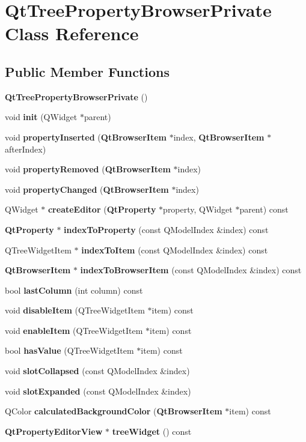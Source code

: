 \section{Qt\+Tree\+Property\+Browser\+Private Class Reference}
\label{classQtTreePropertyBrowserPrivate}
\subsection*{Public Member Functions}
\begin{DoxyCompactItemize}
\item 
{\bf Qt\+Tree\+Property\+Browser\+Private} ()
\item 
void {\bf init} (Q\+Widget $\ast$parent)
\item 
void {\bf property\+Inserted} ({\bf Qt\+Browser\+Item} $\ast$index, {\bf Qt\+Browser\+Item} $\ast$after\+Index)
\item 
void {\bf property\+Removed} ({\bf Qt\+Browser\+Item} $\ast$index)
\item 
void {\bf property\+Changed} ({\bf Qt\+Browser\+Item} $\ast$index)
\item 
Q\+Widget $\ast$ {\bf create\+Editor} ({\bf Qt\+Property} $\ast$property, Q\+Widget $\ast$parent) const 
\item 
{\bf Qt\+Property} $\ast$ {\bf index\+To\+Property} (const Q\+Model\+Index \&index) const 
\item 
Q\+Tree\+Widget\+Item $\ast$ {\bf index\+To\+Item} (const Q\+Model\+Index \&index) const 
\item 
{\bf Qt\+Browser\+Item} $\ast$ {\bf index\+To\+Browser\+Item} (const Q\+Model\+Index \&index) const 
\item 
bool {\bf last\+Column} (int column) const 
\item 
void {\bf disable\+Item} (Q\+Tree\+Widget\+Item $\ast$item) const 
\item 
void {\bf enable\+Item} (Q\+Tree\+Widget\+Item $\ast$item) const 
\item 
bool {\bf has\+Value} (Q\+Tree\+Widget\+Item $\ast$item) const 
\item 
void {\bf slot\+Collapsed} (const Q\+Model\+Index \&index)
\item 
void {\bf slot\+Expanded} (const Q\+Model\+Index \&index)
\item 
Q\+Color {\bf calculated\+Background\+Color} ({\bf Qt\+Browser\+Item} $\ast$item) const 
\item 
{\bf Qt\+Property\+Editor\+View} $\ast$ {\bf tree\+Widget} () const 

\end{DoxyCompactItemize}
